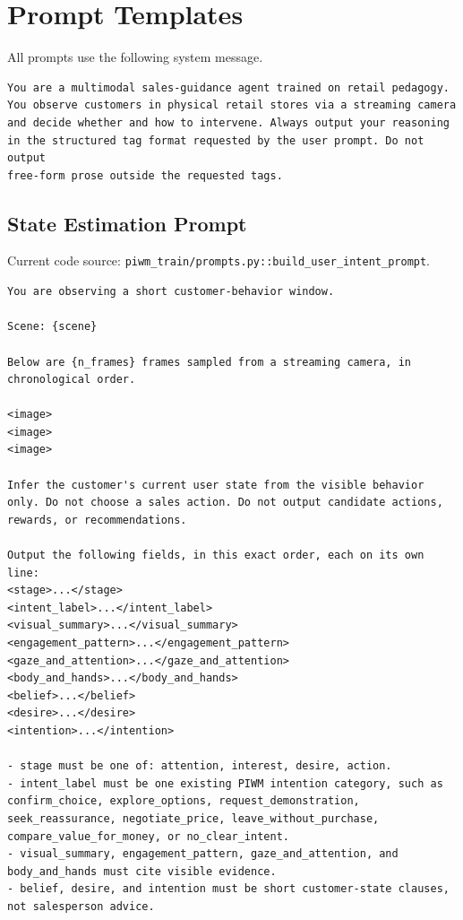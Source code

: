 \appendix

\section{Prompt Templates}
\label{app:prompts}

All prompts use the following system message.

\begin{verbatim}
You are a multimodal sales-guidance agent trained on retail pedagogy.
You observe customers in physical retail stores via a streaming camera
and decide whether and how to intervene. Always output your reasoning
in the structured tag format requested by the user prompt. Do not output
free-form prose outside the requested tags.
\end{verbatim}

\subsection{State Estimation Prompt}
\label{app:prompt_state}

Current code source: \texttt{piwm\_train/prompts.py::build\_user\_intent\_prompt}.

\begin{verbatim}
You are observing a short customer-behavior window.

Scene: {scene}

Below are {n_frames} frames sampled from a streaming camera, in chronological order.

<image>
<image>
<image>

Infer the customer's current user state from the visible behavior only. Do not choose a sales action. Do not output candidate actions, rewards, or recommendations.

Output the following fields, in this exact order, each on its own line:
<stage>...</stage>
<intent_label>...</intent_label>
<visual_summary>...</visual_summary>
<engagement_pattern>...</engagement_pattern>
<gaze_and_attention>...</gaze_and_attention>
<body_and_hands>...</body_and_hands>
<belief>...</belief>
<desire>...</desire>
<intention>...</intention>

- stage must be one of: attention, interest, desire, action.
- intent_label must be one existing PIWM intention category, such as confirm_choice, explore_options, request_demonstration, seek_reassurance, negotiate_price, leave_without_purchase, compare_value_for_money, or no_clear_intent.
- visual_summary, engagement_pattern, gaze_and_attention, and body_and_hands must cite visible evidence.
- belief, desire, and intention must be short customer-state clauses, not salesperson advice.
\end{verbatim}

